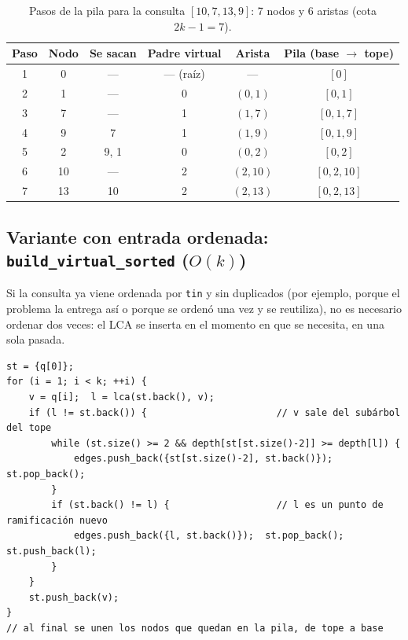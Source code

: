 \documentclass[11pt,a4paper]{article}
\theoremstyle{plain}
\begin{document}
\begin{table}[H]
  \centering
  \begin{tabular}{@{}cccccc@{}}
    \toprule
    \textbf{Paso} & \textbf{Nodo} & \textbf{Se sacan} & \textbf{Padre virtual} &
    \textbf{Arista} & \textbf{Pila (base $\to$ tope)} \\
    \midrule
    1 & 0  & ---      & --- (raíz) & ---       & $[0]$ \\
    2 & 1  & ---      & 0          & $(0,1)$   & $[0, 1]$ \\
    3 & 7  & ---      & 1          & $(1,7)$   & $[0, 1, 7]$ \\
    4 & 9  & 7        & 1          & $(1,9)$   & $[0, 1, 9]$ \\
    5 & 2  & 9, 1     & 0          & $(0,2)$   & $[0, 2]$ \\
    6 & 10 & ---      & 2          & $(2,10)$  & $[0, 2, 10]$ \\
    7 & 13 & 10       & 2          & $(2,13)$  & $[0, 2, 13]$ \\
    \bottomrule
  \end{tabular}
  \caption{Pasos de la pila para la consulta $[10, 7, 13, 9]$: 7 nodos y 6 aristas
  (cota $2k-1 = 7$).}
  \label{tab:traza}
\end{table}

\subsection{\texorpdfstring{Variante con entrada ordenada: \texttt{build\_virtual\_sorted} ($O(k)$)}{Variante con entrada ordenada: build\_virtual\_sorted, O(k)}}
Si la consulta ya viene ordenada por \texttt{tin} y sin duplicados (por ejemplo, porque el
problema la entrega así o porque se ordenó una vez y se reutiliza), no es necesario ordenar
dos veces: el LCA se inserta en el momento en que se necesita, en una sola pasada.

\begin{lstlisting}
st = {q[0]};
for (i = 1; i < k; ++i) {
    v = q[i];  l = lca(st.back(), v);
    if (l != st.back()) {                       // v sale del subárbol del tope
        while (st.size() >= 2 && depth[st[st.size()-2]] >= depth[l]) {
            edges.push_back({st[st.size()-2], st.back()});  st.pop_back();
        }
        if (st.back() != l) {                   // l es un punto de ramificación nuevo
            edges.push_back({l, st.back()});  st.pop_back();  st.push_back(l);
        }
    }
    st.push_back(v);
}
// al final se unen los nodos que quedan en la pila, de tope a base
\end{lstlisting}
\end{document}
